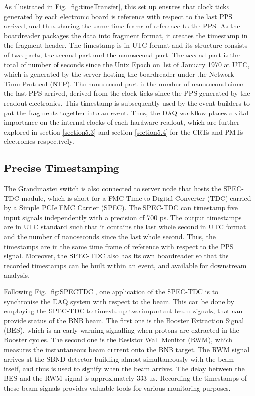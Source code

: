As illustrated in Fig. \ref{fig:timeTransfer}, this set up ensures that clock ticks generated by each electronic board is reference with respect to the last PPS arrived, and thus sharing the same time frame of reference to the PPS.
As the boardreader packages the data into fragment format, it creates the timestamp in the fragment header.
The timestamp is in UTC format and its structure consists of two parts, the second part and the nanosecond part.
The second part is the total of number of seconds since the Unix Epoch on 1st of January 1970 at UTC, which is generated by the server hosting the boardreader under the Network Time Protocol (NTP).
The nanosecond part is the number of nanosecond since the last PPS arrived, derived from the clock ticks since the PPS generated by the readout electronics.
This timestamp is subsequently used by the event builders to put the fragments together into an event.
Thus, the DAQ workflow places a vital importance on the internal clocks of each hardware readout, which are further explored in section \ref{section5.3} and section \ref{section5.4} for the CRTs and PMTs electronics respectively.

\subsection{Precise Timestamping}
\label{section5.2.2}

The Grandmaster switch is also connected to server node that hosts the SPEC-TDC module, which is short for a FMC Time to Digital Converter (TDC) carried by a Simple PCIe FMC Carrier (SPEC).
The SPEC-TDC can timestamp five input signals independently with a precision of 700 ps.
The output timestamps are in UTC standard such that it contains the last whole second in UTC format and the number of nanoseconds since the last whole second.
Thus, the timestamps are in the same time frame of reference with respect to the PPS signal.
Moreover, the SPEC-TDC also has its own boardreader so that the recorded timestamps can be built within an event, and available for downstream analysis.

Following Fig. \ref{fig:SPECTDC}, one application of the SPEC-TDC is to synchronise the DAQ system with respect to the beam.
This can be done by employing the SPEC-TDC to timestamp two important beam signals, that can provide status of the BNB beam.
The first one is the Booster Extraction Signal (BES), which is an early warning signalling when protons are extracted in the Booster cycles.
The second one is the Resistor Wall Monitor (RWM), which measures the instantaneous beam current onto the BNB target.
The RWM signal arrives at the SBND detector building almost simultaneously with the beam itself, and thus is used to signify when the beam arrives.
The delay between the BES and the RWM signal is approximately 333 us.
Recording the timestamps of these beam signals provides valuable tools for various monitoring purposes. 

